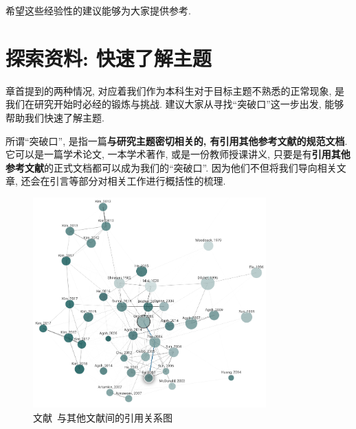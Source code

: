 \documentclass{formatBook}
\begin{document}
希望这些经验性的建议能够为大家提供参考.

\section{探索资料: 快速了解主题}
章首提到的两种情况, 对应着我们作为本科生对于目标主题不熟悉的正常现象, 是我们在研究开始时必经的锻炼与挑战. 建议大家从寻找``突破口''这一步出发, 能够帮助我们快速了解主题.

所谓``突破口'', 是指一篇\textbf{与研究主题密切相关的, 有引用其他参考文献的规范文档}. 它可以是一篇学术论文, 一本学术著作, 或是一份教师授课讲义, 只要是有\textbf{引用其他参考文献}的正式文档都可以成为我们的``突破口''. 因为他们不但将我们导向相关文章, 还会在引言等部分对相关工作进行概括性的梳理.

\begin{figure}[H]
    \centering
    \includegraphics[width=0.8\textwidth]{figure/graph.png}
    \caption{文献~\cite{GesselMiki2005}与其他文献间的引用关系图}
    \label{fig:mikiGrapg}
\end{figure}
\end{document}
